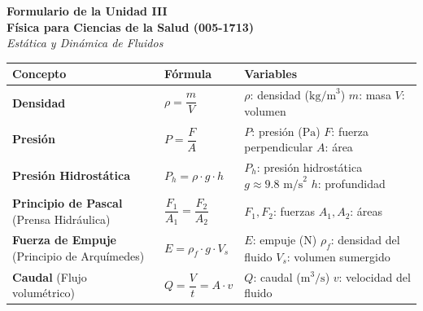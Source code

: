 \documentclass[12pt,letterpaper]{article}
\begin{document}
\begin{center}
    \textbf{\Large Formulario de la Unidad III}\\
    \vspace{0.2cm}
    \textbf{Física para Ciencias de la Salud (005-1713)}\\
    \vspace{0.2cm}
    \textit{Estática y Dinámica de Fluidos}
\end{center}

\vspace{0.5cm}

\begin{table}[h!]
    \centering
    \renewcommand{\arraystretch}{2.2} %
    \begin{tabular}{|>{\raggedright\arraybackslash}p{4cm}|>{\centering\arraybackslash}p{5.5cm}|>{\raggedright\arraybackslash}p{5cm}|}
        \hline
        \textbf{Concepto} & \textbf{Fórmula} & \textbf{Variables} \\
        \hline
        \textbf{Densidad} & $\rho = \dfrac{m}{V}$ & $\rho$: densidad ($\text{kg/m}^3$) \newline $m$: masa \newline $V$: volumen \\
        \hline
        \textbf{Presión} & $P = \dfrac{F}{A}$ & $P$: presión ($\text{Pa}$) \newline $F$: fuerza perpendicular \newline $A$: área \\
        \hline
        \textbf{Presión Hidrostática} & $P_h = \rho \cdot g \cdot h$ & $P_h$: presión hidrostática \newline $g \approx 9.8 \text{ m/s}^2$ \newline $h$: profundidad \\
        \hline
        \textbf{Principio de Pascal} \newline (Prensa Hidráulica) & $\dfrac{F_1}{A_1} = \dfrac{F_2}{A_2}$ & $F_1, F_2$: fuerzas \newline $A_1, A_2$: áreas \\
        \hline
        \textbf{Fuerza de Empuje} \newline (Principio de Arquímedes) & $E = \rho_f \cdot g \cdot V_s$ & $E$: empuje ($\text{N}$) \newline $\rho_f$: densidad del fluido \newline $V_s$: volumen sumergido \\
        \hline
        \textbf{Caudal} \newline (Flujo volumétrico) & $Q = \dfrac{V}{t} = A \cdot v$ & $Q$: caudal ($\text{m}^3\text{/s}$) \newline $v$: velocidad del fluido \\

\end{tabular}
\end{table}
\end{document}
